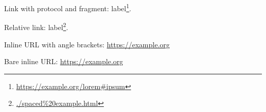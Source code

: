 Link with protocol and fragment: label\footnote{\url{https://example.org/lorem\#ipsum}}.

Relative link: label\footnote{\url{./spaced\%20example.html}}.

Inline URL with angle brackets: \url{https://example.org}

Bare inline URL: \url{https://example.org}


